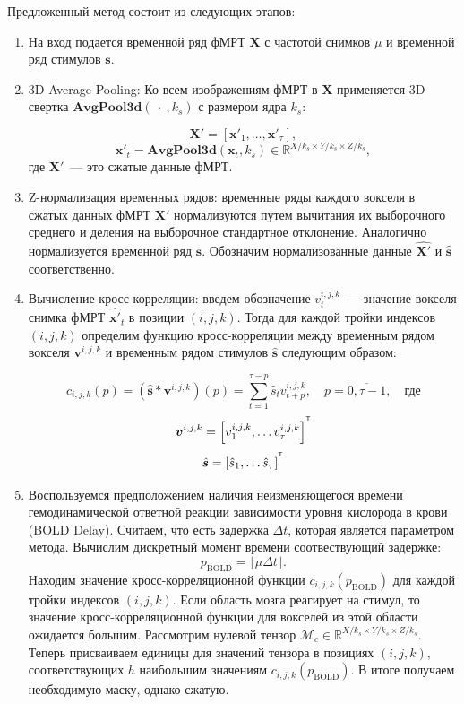 \documentclass[a4paper, 12pt]{extarticle}
\begin{document}
Предложенный метод состоит из следующих этапов:
\begin{enumerate}
    \item На вход подается временной ряд фМРТ $\bm{X}$ с частотой снимков $\mu$ и временной ряд стимулов $\bm{s}$.
    \item 3D Average Pooling: Ко всем изображениям фМРТ в $\bm{X}$ применяется 3D свертка $\textbf{AvgPool3d}(~\cdot~,  k_s)$ с размером ядра $k_s$:

    \begin{equation*}
    \bm{X}' = \left[\bm{x}'_1, \dots, \bm{x}'_{\tau}\right],
    \end{equation*}
    \begin{equation*}
    \bm{x}'_t = \textbf{AvgPool3d}(\bm{x}_t, k_s) \in \mathbb{R}^{X/ k_s \times Y/ k_s \times Z/ k_s}, 
    \end{equation*}
    где $\bm{X}'$~--- это сжатые данные фМРТ.

    \item Z-нормализация временных рядов: временные ряды каждого вокселя в сжатых данных фМРТ $\bm{X}'$ нормализуются путем вычитания их выборочного среднего и деления на выборочное стандартное отклонение. Аналогично нормализуется временной ряд $\bm{s}$. Обозначим нормализованные данные $\hat{\bm{X}'}$ и $\hat{\bm{s}}$ соответственно. 


    \item Вычисление кросс-корреляции: введем обозначение $v^{i,j,k}_t$~--- значение вокселя снимка фМРТ $\hat{\bm{x}'}_t$ в позиции $(i,j,k)$. Тогда для каждой тройки индексов $(i,j,k)$ определим функцию кросс-корреляции между временным рядом вокселя $\bm{v}^{i,j,k}$ и временным рядом стимулов $\hat{\bm{s}}$ следующим образом:
    
    \begin{equation*}
        c_{i,j,k}(p) = \left(\hat{\bm{s}} * \bm{v}^{i,j,k}\right)(p)=\sum_{t=1}^{\tau-p} \hat{s}_{t}v^{i,j,k}_{t+p}, \quad p = \overline{0, \tau-1},\quad \text{где}
    \end{equation*}
        $$\bm{v}^{i,j,k}=\left[v^{i,j,k}_1, \dots v^{i,j,k}_{\tau}\right]^{^{\mathsf{T}}}$$
        $$\hat{\bm{s}} = \left[\hat{s}_1, \dots \hat{s}_{\tau}\right]^{^{\mathsf{T}}}$$ 


    \item Воспользуемся предположением наличия неизменяющегося времени гемодинамической ответной реакции зависимости уровня кислорода в крови (BOLD Delay). Считаем, что есть задержка $\Delta t$, которая является параметром метода. Вычислим дискретный момент времени соотвествующий задержке:
    $$p_{\text{BOLD}} = \lfloor\mu\Delta t \rfloor.$$
    Находим значение кросс-корреляционной функции $c_{i,j,k}(p_{\text{BOLD}})$ для каждой тройки индексов $(i,j,k)$. 
	Если область мозга реагирует на стимул, то значение кросс-корреляционной функции для вокселей из этой области ожидается большим.
	Рассмотрим нулевой тензор $\mathcal{M}_c \in \mathbb{R}^{X/ k_s \times Y/ k_s \times Z/ k_s}$.
	Теперь присваиваем единицы для значений тензора в позициях $(i,j,k)$, соответствующих $h$ наибольшим значениям $c_{i,j,k}(p_{\text{BOLD}})$. В итоге получаем необходимую маску, однако сжатую.


\end{enumerate}
\end{document}
